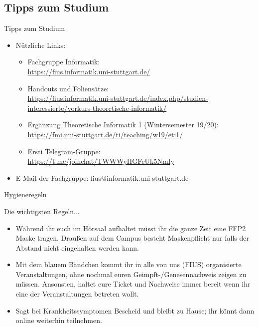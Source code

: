 \subsection{Tipps zum Studium}
\begin{frame}[fragile]{Tipps zum Studium}
    \begin{itemize}
        \item Nützliche Links:\\
            \begin{itemize}
                \item Fachgruppe Informatik:\\
                \url{https://fius.informatik.uni-stuttgart.de/}
                \item Handouts und Foliensätze:\\ \url{https://fius.informatik.uni-stuttgart.de/index.php/studien-interessierte/vorkurs-theoretische-informatik/}
                \item Ergänzung Theoretische Informatik 1 (Wintersemester 19/20): \\
                \url{https://fmi.uni-stuttgart.de/ti/teaching/w19/eti1/}
                \item Ersti Telegram-Gruppe:\\
                 \url{https://t.me/joinchat/TWWWyHGFcUk5NmIy}
        	\end{itemize}
        \item E-Mail der Fachgruppe: fius@informatik.uni-stuttgart.de

    \end{itemize}
\end{frame}

\begin{frame}[fragile]{Hygieneregeln}
	\begin{alertblock}{Die wichtigsten Regeln...}
		\begin{itemize}
			\item Während ihr euch im Hörsaal aufhaltet müsst ihr die ganze Zeit eine FFP2 Maske tragen. Draußen auf dem Campus besteht Maskenpflicht nur falls der Abstand nicht eingehalten werden kann.
			\item Mit dem blauem Bändchen kommt ihr in alle von uns (FIUS) organisierte Veranstaltungen, ohne nochmal euren Geimpft-/Genesennachweis zeigen zu müssen. Ansonsten, haltet eure Ticket und Nachweise immer bereit wenn ihr eine der Veranstaltungen betreten wollt.
			\item Sagt bei Krankheitssymptomen Bescheid und bleibt zu Hause; ihr könnt dann online weiterhin teilnehmen.
		\end{itemize}
	\end{alertblock}
\end{frame}

